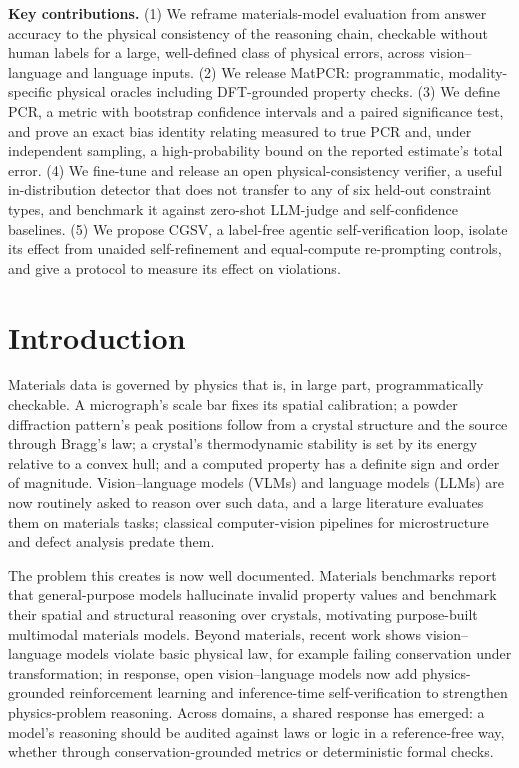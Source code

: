 \documentclass[pdflatex,sn-nature]{sn-jnl}
\begin{document}
\noindent\begin{tcolorbox}[colback=gray!6,colframe=gray!50,boxrule=0.5pt]
\textbf{Key contributions.} (1) We reframe materials-model evaluation from answer accuracy to the physical
consistency of the reasoning chain, checkable without human labels for a large,
well-defined class of physical errors, across vision--language and language inputs. (2) We release MatPCR: programmatic,
modality-specific physical oracles including DFT-grounded property checks. (3) We
define PCR, a metric with bootstrap confidence intervals and a paired significance
test, and prove an exact bias identity relating measured to true PCR and, under
independent sampling, a high-probability bound on the reported estimate's total error.
(4) We fine-tune and release an open physical-consistency verifier, a useful
in-distribution detector that does not transfer to any of six held-out constraint types,
and benchmark it against zero-shot LLM-judge and self-confidence baselines. (5) We
propose CGSV, a label-free agentic self-verification loop, isolate its effect from
unaided self-refinement and equal-compute re-prompting controls, and give a protocol to measure
its effect on violations.
\end{tcolorbox}

\section*{Introduction}
Materials data is governed by physics that is, in large part, programmatically
checkable. A micrograph's scale bar fixes its spatial calibration; a powder
diffraction pattern's peak positions follow from a crystal structure and the source
through Bragg's law; a crystal's thermodynamic stability is set by its energy
relative to a convex hull; and a computed property has a definite sign and order of
magnitude. Vision--language models (VLMs) and language models (LLMs) are now
routinely asked to reason over such data, and a large literature evaluates them on
materials tasks;\cite{lai2025materials,npj2026vlmeval,choudhary2025microscopygpt,li2024mmsci}
classical computer-vision pipelines for microstructure and defect analysis predate
them.\cite{holm2020cv,li2018defect}

The problem this creates is now well documented. Materials benchmarks report that
general-purpose models hallucinate invalid property values\cite{llm4matbench2024,lai2025materials}
and benchmark their spatial and structural reasoning over crystals,\cite{atomworld2025}
motivating purpose-built multimodal materials models.\cite{matterchat2026} Beyond
materials, recent work shows vision--language models violate basic physical law,
for example failing conservation under transformation;\cite{conservationbench2026}
in response, open vision--language models now add physics-grounded reinforcement
learning and inference-time self-verification to strengthen physics-problem
reasoning.\cite{p1vl2026} Across domains, a shared response has emerged:
a model's reasoning should be audited against laws or logic in a
reference-free way, whether through conservation-grounded metrics or deterministic
formal checks.\cite{conservationbench2026,neurosymclinical2026}
\end{document}
